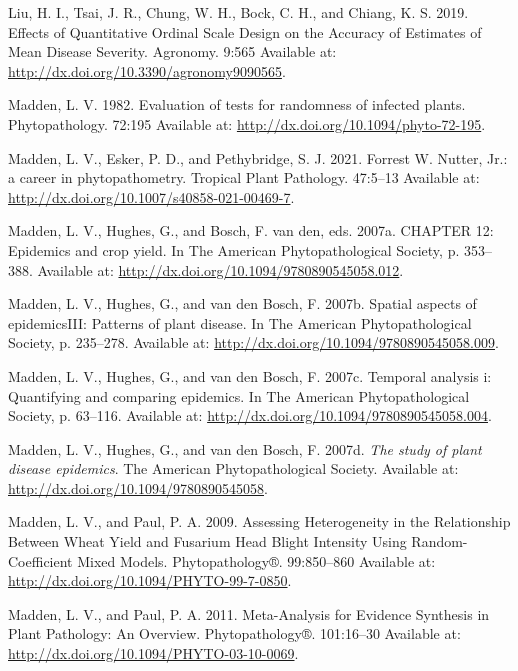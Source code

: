 \documentclass[
  letterpaper,
]{book}
\newlength{\cslhangindent}
\newlength{\cslentryspacingunit} %
\newenvironment{CSLReferences}[2] %
 {%
  \setlength{\parindent}{0pt}
  \ifodd #1
  \let\oldpar\par
  \def\par{\hangindent=\cslhangindent\oldpar}
  \fi
  \setlength{\parskip}{#2\cslentryspacingunit}
 }%
 {}
\begin{document}
\begin{CSLReferences}{0}{0}
\leavevmode{}%
Liu, H. I., Tsai, J. R., Chung, W. H., Bock, C. H., and Chiang, K. S.
2019. Effects of Quantitative Ordinal Scale Design on the Accuracy of
Estimates of Mean Disease Severity. Agronomy. 9:565 Available at:
\url{http://dx.doi.org/10.3390/agronomy9090565}.

\leavevmode{}%
Madden, L. V. 1982. Evaluation of tests for randomness of infected
plants. Phytopathology. 72:195 Available at:
\url{http://dx.doi.org/10.1094/phyto-72-195}.

\leavevmode{}%
Madden, L. V., Esker, P. D., and Pethybridge, S. J. 2021. Forrest W.
Nutter, Jr.: a career in phytopathometry. Tropical Plant Pathology.
47:5--13 Available at:
\url{http://dx.doi.org/10.1007/s40858-021-00469-7}.

\leavevmode{}%
Madden, L. V., Hughes, G., and Bosch, F. van den, eds. 2007a. CHAPTER
12: Epidemics and crop yield. In The American Phytopathological Society,
p. 353--388. Available at:
\url{http://dx.doi.org/10.1094/9780890545058.012}.

\leavevmode{}%
Madden, L. V., Hughes, G., and van den Bosch, F. 2007b. Spatial aspects
of epidemics{\textemdash}III: Patterns of plant disease. In The American
Phytopathological Society, p. 235--278. Available at:
\url{http://dx.doi.org/10.1094/9780890545058.009}.

\leavevmode{}%
Madden, L. V., Hughes, G., and van den Bosch, F. 2007c. Temporal
analysis i: Quantifying and comparing epidemics. In The American
Phytopathological Society, p. 63--116. Available at:
\url{http://dx.doi.org/10.1094/9780890545058.004}.

\leavevmode{}%
Madden, L. V., Hughes, G., and van den Bosch, F. 2007d. \emph{The study
of plant disease epidemics}. The American Phytopathological Society.
Available at: \url{http://dx.doi.org/10.1094/9780890545058}.

\leavevmode{}%
Madden, L. V., and Paul, P. A. 2009. Assessing Heterogeneity in the
Relationship Between Wheat Yield and Fusarium Head Blight Intensity
Using Random-Coefficient Mixed Models. Phytopathology®. 99:850--860
Available at: \url{http://dx.doi.org/10.1094/PHYTO-99-7-0850}.

\leavevmode{}%
Madden, L. V., and Paul, P. A. 2011. Meta-Analysis for Evidence
Synthesis in Plant Pathology: An Overview. Phytopathology®. 101:16--30
Available at: \url{http://dx.doi.org/10.1094/PHYTO-03-10-0069}.


\end{CSLReferences}
\end{document}
